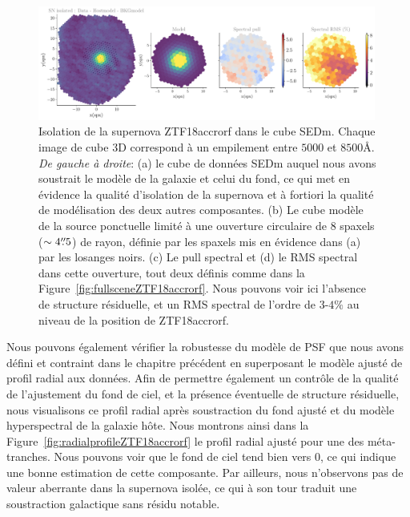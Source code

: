 \documentclass[../main/main.tex]{subfiles}
\begin{document}
\begin{figure}
  \centering
  \includegraphics[width=0.99\textwidth]{../figures/07_scene/output_sn_ifu_ZTF18accrorf.pdf}
  \caption[Isolation de la supernova ZTF18accrorf dans le cube
  SEDm.]{Isolation de la supernova ZTF18accrorf dans le cube
    SEDm. Chaque image de cube 3D correspond à un empilement entre
    $5000$ et $8500$\AA. \emph{De gauche à droite}: (a) le cube de données SEDm auquel
    nous avons soustrait le modèle de la galaxie et celui du fond, ce
    qui met en évidence la qualité d'isolation de la supernova et à
    fortiori la qualité de modélisation des deux autres composantes. (b)
  Le cube modèle de la source ponctuelle limité à une ouverture
  circulaire de $8$ spaxels ($\sim4\overset{\prime\prime}{.}5$) de
rayon, définie par les spaxels mis en évidence dans (a) par les losanges
noirs. (c) Le pull spectral et (d) le RMS spectral dans cette ouverture,
tout deux définis comme dans la
Figure~\ref{fig:fullsceneZTF18accrorf}. Nous pouvons voir ici l'absence
de structure résiduelle, et un RMS spectral de l'ordre de $3$-$4\%$ au niveau de la position de ZTF18accrorf.}
  \label{fig:targetisolatedZTF18accrorf}
\end{figure}

Nous pouvons également vérifier la robustesse du modèle de PSF que nous
avons défini et contraint dans le chapitre précédent en superposant le
modèle ajusté de profil radial aux données. Afin de permettre également
un contrôle de la qualité de l'ajustement du fond de ciel, et la
présence éventuelle de structure résiduelle, nous visualisons ce profil
radial après soustraction du fond ajusté et du modèle hyperspectral de
la galaxie hôte. Nous montrons ainsi dans la
Figure~\ref{fig:radialprofileZTF18accrorf} le profil radial ajusté pour
une des méta-tranches. Nous pouvons voir que le fond de ciel tend bien
vers $0$, ce qui indique une bonne estimation de cette composante. Par
ailleurs, nous n'observons pas de valeur aberrante dans la supernova
isolée, ce qui à son tour traduit une soustraction galactique sans
résidu notable.
\end{document}

